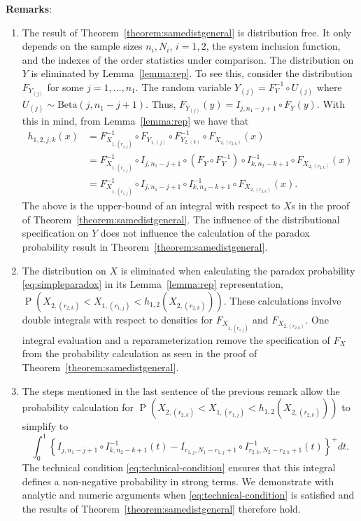 \documentclass[12pt]{article}
\DeclareMathOperator*{\Prob}{P}
\begin{document}
\noindent \textbf{Remarks}:
\begin{enumerate}
	\item The result of Theorem~\ref{theorem:samedistgeneral} is distribution free. It only depends on the sample sizes $n_i, N_i$, $i = 1,2$, the system inclusion function, and the indexes of the order statistics under comparison. The distribution on $Y$ is eliminated by Lemma~\ref{lemma:rep}. To see this, consider the distribution $F_{Y_{(j)}}$ for some $j = 1,\ldots,n_1$. The random variable $Y_{(j)} = F_Y^{-1} \circ U_{(j)}$ where $U_{(j)} \sim \text{Beta}(j,n_1-j+1)$. Thus, $F_{Y_{(j)}}(y) = I_{j,n_1-j+1} \circ F_Y (y)$. With this in mind, from Lemma~\ref{lemma:rep} we have that
\begin{align*}
	h_{1,2,j,k}(x) &= F_{X_{1,(r_{1,j})}}^{-1} \circ F_{Y_{1, (j)}} \circ F_{Y_{2, (k)}}^{-1} \circ F_{X_{2,(r_{2,k})}} (x) \\
	&= F_{X_{1,(r_{1,j})}}^{-1} \circ I_{j,n_1-j+1} \circ \left(F_Y \circ F_Y^{-1}\right) \circ I^{-1}_{k,n_2-k+1} \circ F_{X_{2,(r_{2,k})}} (x) \\
	&= F_{X_{1,(r_{1,j})}}^{-1} \circ I_{j,n_1-j+1}  \circ I^{-1}_{k,n_2-k+1} \circ F_{X_{2,(r_{2,k})}} (x).
\end{align*}
The above is the upper-bound of an integral with respect to $X$s in the proof of Theorem~\ref{theorem:samedistgeneral}. The influence of the distributional specification on $Y$ does not influence the calculation of the paradox probability result in Theorem~\ref{theorem:samedistgeneral}.
	\item The distribution on $X$ is eliminated when calculating the paradox probability \eqref{eq:simpleparadox} in its Lemma~\ref{lemma:rep} representation, $\Prob\left( X_{2,(r_{2,k})} < X_{1,(r_{1,j})}  < h_{1,2}\left(X_{2,(r_{2,k})}\right)\right)$. These calculations involve double integrals with respect to densities for $F_{X_{1,(r_{1,j})}}$ and $F_{X_{2,(r_{2,k})}}$. One integral evaluation and a reparameterization remove the specification of $F_X$ from the probability calculation as seen in the proof of Theorem~\ref{theorem:samedistgeneral}.
	\item The steps mentioned in the last sentence of the previous remark allow the probability calculation for $\Prob\left( X_{2,(r_{2,k})} < X_{1,(r_{1,j})}  < h_{1,2}\left(X_{2,(r_{2,k})}\right)\right)$ to simplify to 
$$
	\int_0^1\left\{I_{j, n_1-j+1} \circ I_{k, n_2-k+1}^{-1} (t) - I_{r_{1,j}, N_1 - r_{1,j}+1} \circ I_{r_{2,k}, N_2 - r_{2,k} + 1}^{-1}(t)\right\}^+ dt.
$$
The technical condition \eqref{eq:technical-condition} ensures that this integral defines a non-negative probability in strong terms. We demonstrate with analytic and numeric arguments when \eqref{eq:technical-condition} is satisfied and the results of Theorem~\ref{theorem:samedistgeneral} therefore hold.
\end{enumerate}
\end{document}
